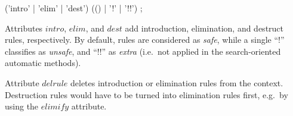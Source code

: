 \begin{rail}
  ('intro' | 'elim' | 'dest') (() | '!' | '!!')
  ;
\end{rail}

\begin{descr}
\item [Attributes $intro$, $elim$, and $dest$] add introduction, elimination,
  and destruct rules, respectively.  By default, rules are considered as
  \emph{safe}, while a single ``!'' classifies as \emph{unsafe}, and ``!!'' as
  \emph{extra} (i.e.\ not applied in the search-oriented automatic methods).

\item [Attribute $delrule$] deletes introduction or elimination rules from the
  context.  Destruction rules would have to be turned into elimination rules
  first, e.g.\ by using the $elimify$ attribute.
\end{descr}


